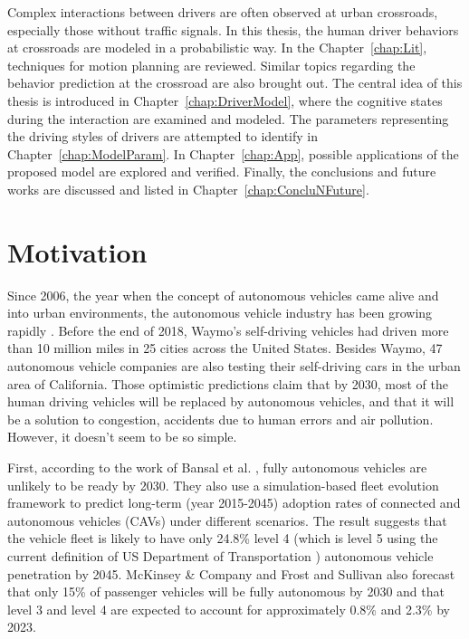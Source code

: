 

Complex interactions between drivers are often observed at urban crossroads, especially those without traffic signals. In this thesis, the human driver behaviors at crossroads are modeled in a probabilistic way. In the Chapter~\ref{chap:Lit}, techniques for motion planning are reviewed. Similar topics regarding the behavior prediction at the crossroad are also brought out. The central idea of this thesis is introduced in Chapter~\ref{chap:DriverModel}, where the cognitive states during the interaction are examined and modeled. The parameters representing the driving styles of drivers are attempted to identify in Chapter~\ref{chap:ModelParam}. In Chapter~\ref{chap:App}, possible applications of the proposed model are explored and verified. Finally, the conclusions and future works are discussed and listed in Chapter~\ref{chap:ConcluNFuture}. 

\section{Motivation}

Since 2006, the year when the concept of autonomous vehicles came alive and into urban environments, the autonomous vehicle industry has been growing rapidly \cite{thrun2006}. Before the end of 2018, Waymo's self-driving vehicles had driven more than 10 million miles in 25 cities across the United States. Besides Waymo, 47 autonomous vehicle companies are also testing their self-driving cars in the urban area of California. Those optimistic predictions claim that by 2030, most of the human driving vehicles will be replaced by autonomous vehicles, and that it will be a solution to congestion, accidents due to human errors and air pollution. However, it doesn't seem to be so simple. 

First, according to the work of Bansal et al. \cite{Prateek2017}, fully autonomous vehicles are unlikely to be ready by 2030. They also use a simulation-based fleet evolution framework to predict long-term (year 2015-2045) adoption rates of connected and autonomous vehicles (CAVs) under different scenarios. The result suggests that the vehicle fleet is likely to have only 24.8\% level 4 (which is level 5 using the current definition of US Department of Transportation \cite{AV_levels2019}) autonomous vehicle penetration by 2045. McKinsey \& Company and Frost and Sullivan also forecast that only 15\% of passenger vehicles will be fully autonomous by 2030 and that level 3 and level 4 are expected to account for approximately 0.8\% and 2.3\% by 2023. 

